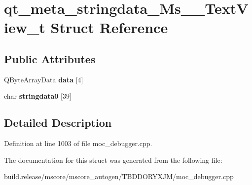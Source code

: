 \hypertarget{structqt__meta__stringdata___ms_____text_view__t}{}\section{qt\+\_\+meta\+\_\+stringdata\+\_\+\+Ms\+\_\+\+\_\+\+Text\+View\+\_\+t Struct Reference}
\label{structqt__meta__stringdata___ms_____text_view__t}
\subsection*{Public Attributes}
\begin{DoxyCompactItemize}
\item 
\mbox{\label{structqt__meta__stringdata___ms_____text_view__t_a5375a93f0ebdab59e4a345da9c6ca30e}} 
Q\+Byte\+Array\+Data {\bfseries data} \mbox{[}4\mbox{]}
\item 
\mbox{\label{structqt__meta__stringdata___ms_____text_view__t_a6643a819bed38a49150e5dcb1a311baf}} 
char {\bfseries stringdata0} \mbox{[}39\mbox{]}
\end{DoxyCompactItemize}


\subsection{Detailed Description}


Definition at line 1003 of file moc\+\_\+debugger.\+cpp.



The documentation for this struct was generated from the following file\+:\begin{DoxyCompactItemize}
\item 
build.\+release/mscore/mscore\+\_\+autogen/\+T\+B\+D\+D\+O\+R\+Y\+X\+J\+M/moc\+\_\+debugger.\+cpp\end{DoxyCompactItemize}
